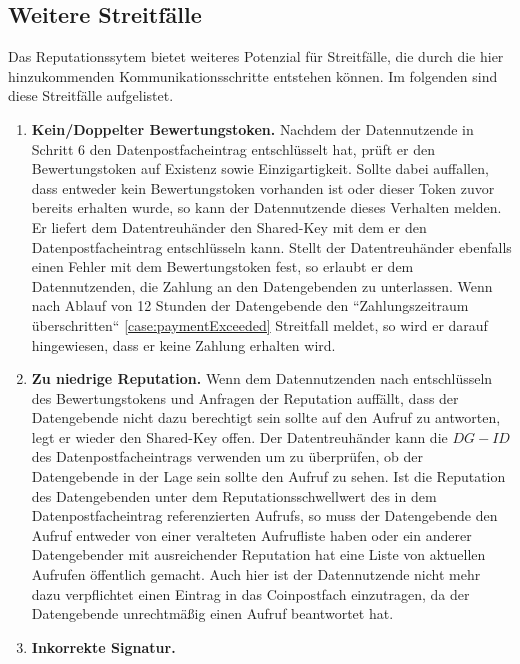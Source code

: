 \documentclass{scrreprt}
\begin{document}
\subsection{Weitere Streitfälle}
\label{subsec:repStreit}
Das Reputationssytem bietet weiteres Potenzial für Streitfälle, die durch die hier hinzukommenden Kommunikationsschritte entstehen können. Im folgenden sind diese Streitfälle aufgelistet.
\begin{enumerate}
    \item \textbf{Kein/Doppelter Bewertungstoken.} \label{case:badRepToken}
    Nachdem der Datennutzende in Schritt 6 den Datenpostfacheintrag entschlüsselt hat, prüft er den Bewertungstoken auf Existenz sowie Einzigartigkeit. Sollte dabei auffallen, dass entweder kein Bewertungstoken vorhanden ist oder dieser Token zuvor bereits erhalten wurde, so kann der Datennutzende dieses Verhalten melden. Er liefert dem Datentreuhänder den Shared-Key mit dem er den Datenpostfacheintrag entschlüsseln kann. Stellt der Datentreuhänder ebenfalls einen Fehler mit dem Bewertungstoken fest, so erlaubt er dem Datennutzenden, die Zahlung an den Datengebenden zu unterlassen. Wenn nach Ablauf von 12 Stunden der Datengebende den ``Zahlungszeitraum überschritten`` \ref{case:paymentExceeded} Streitfall meldet, so wird er darauf hingewiesen, dass er keine Zahlung erhalten wird.
    \item \textbf{Zu niedrige Reputation.} \label{case:insufficientRep}
    Wenn dem Datennutzenden nach entschlüsseln des Bewertungstokens und Anfragen der Reputation auffällt, dass der Datengebende nicht dazu berechtigt sein sollte auf den Aufruf zu antworten, legt er wieder den Shared-Key offen. Der Datentreuhänder kann die $DG-ID$ des Datenpostfacheintrags verwenden um zu überprüfen, ob der Datengebende in der Lage sein sollte den Aufruf zu sehen. Ist die Reputation des Datengebenden unter dem Reputationsschwellwert des in dem Datenpostfacheintrag referenzierten Aufrufs, so muss der Datengebende den Aufruf entweder von einer veralteten Aufrufliste haben oder ein anderer Datengebender mit ausreichender Reputation hat eine Liste von aktuellen Aufrufen öffentlich gemacht. Auch hier ist der Datennutzende nicht mehr dazu verpflichtet einen Eintrag in das Coinpostfach einzutragen, da der Datengebende unrechtmäßig einen Aufruf beantwortet hat.
    \item \textbf{Inkorrekte Signatur.} \label{case:badSignature}

\end{enumerate}
\end{document}
